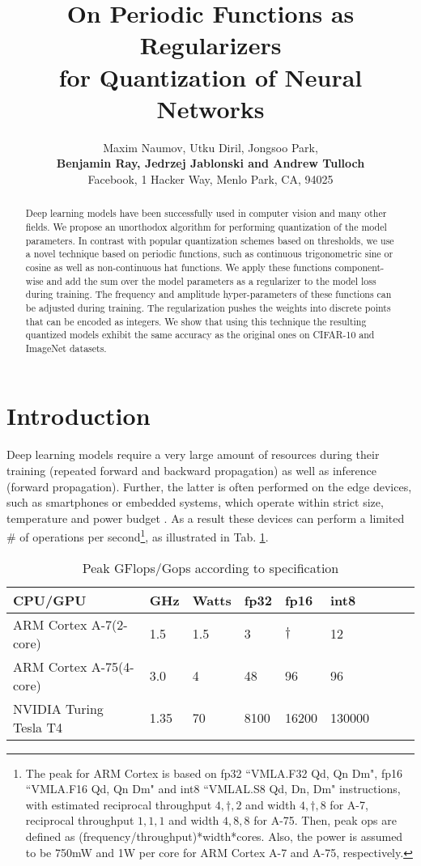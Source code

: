 \documentclass{article}
\title{On Periodic Functions as Regularizers \\ for Quantization of Neural Networks}
\author{Maxim Naumov, Utku Diril, Jongsoo Park, \\ \textbf{Benjamin Ray, Jedrzej Jablonski and Andrew Tulloch} \\ Facebook, 1 Hacker Way, Menlo Park, CA, 94025}
\begin{document}
\maketitle

\begin{abstract}
Deep learning models have been successfully used in computer vision and many other fields. We propose an unorthodox algorithm for performing quantization of the model parameters. In contrast with popular quantization schemes based on thresholds, we use a novel technique based on periodic functions, such as continuous trigonometric sine or cosine as well as non-continuous hat functions. We apply these functions component-wise and add the sum over the model parameters as a regularizer to the model loss during training. The frequency and amplitude hyper-parameters of these functions can be adjusted during training. The regularization pushes the weights into discrete points that can be encoded as integers. We show that using this technique the resulting quantized models exhibit the same accuracy as the original ones on CIFAR-10 and ImageNet datasets.
\end{abstract}


\section{Introduction}

Deep learning models require a very large amount of resources during their training (repeated forward and backward propagation) as well as inference (forward propagation). Further, the latter is often performed on the edge devices, such as smartphones or embedded systems, which operate within strict size, temperature and power budget \cite{Shimpi2011,Humrick2017,Dolbeau2018,Turing2018}. As a result these devices can perform a limited \# of operations per second\footnote{The peak for ARM Cortex is based on fp32 ``VMLA.F32 Qd, Qn Dm", fp16 ``VMLA.F16 Qd, Qn Dm" and int8 ``VMLAL.S8 Qd, Dn, Dm" instructions, with estimated reciprocal throughput $4,\dagger,2$ and width $4,\dagger,8$ for A-7, reciprocal throughput $1,1,1$ and width $4,8,8$ for A-75. Then, peak ops are defined as (frequency/throughput)*width*cores. Also, the power is assumed to be 750mW and 1W per core for ARM Cortex A-7 and A-75, respectively.}, as illustrated in Tab. \ref{tab:typical_cpu_gpu_tops}.

\setcounter{figure}{0}
\setcounter{table}{0}

\begin{table}[h]
\centering
\begin{tabular}{l|l|l|l|l|l|l|l|l}
CPU/GPU                & GHz & Watts  & fp32   & fp16      & int8   \\
\hline
ARM Cortex A-7\phantom{5}(2-core)& 1.5   & 1.5  &  3      & $\dagger$ & 12     \\
ARM Cortex A-75(4-core)& 3.0   & 4    &  48     & 96        & 96    \\
NVIDIA Turing Tesla T4 & 1.35  & 70   &  8100   & 16200     & 130000\\ 
\end{tabular}
\caption{Peak GFlops/Gops according to specification}
\label{tab:typical_cpu_gpu_tops}
\end{table}
\end{document}
